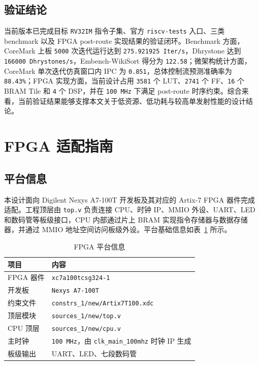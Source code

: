﻿\documentclass[12pt,a4paper]{ctexart}
\begin{document}
\subsection{验证结论}
当前版本已完成目标 \texttt{RV32IM} 指令子集、官方 \texttt{riscv-tests} 入口、三类 benchmark 以及 FPGA post-route 实现结果的验证闭环。Benchmark 方面，CoreMark 上板 \texttt{5000} 次迭代运行达到 \texttt{275.921925 Iter/s}，Dhrystone 达到 \texttt{166000 Dhrystones/s}，Embench-WikiSort 得分为 \texttt{122.58}；微架构统计方面，CoreMark 单次迭代仿真窗口内 IPC 为 \texttt{0.851}，总体控制流预测准确率为 \texttt{88.43\%}；FPGA 实现方面，当前设计占用 \texttt{3581} 个 LUT、\texttt{2741} 个 FF、\texttt{16} 个 BRAM Tile 和 \texttt{4} 个 DSP，并在 \texttt{100 MHz} 下满足 post-route 时序约束。综合来看，当前验证结果能够支撑本文关于低资源、低功耗与较高单发射性能的设计结论。

\section{FPGA 适配指南}

\subsection{平台信息}
本设计面向 Digilent Nexys A7-100T 开发板及其对应的 Artix-7 FPGA 器件完成适配。工程顶层由 \texttt{top.v} 负责连接 CPU、时钟 IP、MMIO 外设、UART、LED 和数码管等板级接口，CPU 内部通过片上 BRAM 实现指令存储器与数据存储器，并通过 MMIO 地址空间访问板级外设。平台基础信息如表~\ref{tab:fpga_platform_info} 所示。

\begin{table}[H]
    \centering
    \caption{FPGA 平台信息}
    \label{tab:fpga_platform_info}
    \begin{tabularx}{\textwidth}{lX}
        \toprule
        项目 & 内容 \\
        \midrule
        FPGA 器件 & \texttt{xc7a100tcsg324-1} \\
        开发板 & \texttt{Nexys A7-100T} \\
        约束文件 & \texttt{constrs\_1/new/Artix7T100.xdc} \\
        顶层模块 & \texttt{sources\_1/new/top.v} \\
        CPU 顶层 & \texttt{sources\_1/new/cpu.v} \\
        主时钟 & \texttt{100 MHz}，由 \texttt{clk\_main\_100mhz} 时钟 IP 生成 \\
        板级输出 & UART、LED、七段数码管 \\
        \bottomrule
    \end{tabularx}
\end{table}
\end{document}
